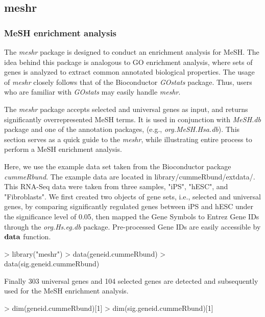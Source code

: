 \documentclass[11pt]{article}
\newcommand{\Rpackage}[1]{{\textit{#1}}}
\begin{document}
\clearpage
\subsection{meshr}
\subsubsection{MeSH enrichment analysis}
The \Rpackage{meshr} package is designed to conduct an enrichment analysis for MeSH.  The idea behind this package is analogous to GO enrichment analysis, where sets of genes is analyzed to extract common annotated biological properties. The usage of \Rpackage{meshr} closely follows that of the Bioconductor \Rpackage{GOstats} package. Thus, users who are familiar with \Rpackage{GOstats} may easily handle \Rpackage{meshr}.

The \Rpackage{meshr} package accepts selected and universal genes as input, and returns significantly overrepresented MeSH terms. It is used in conjunction with \Rpackage{MeSH.db} package and one of the annotation packages, (e.g., \Rpackage{org.MeSH.Hsa.db}). This section serves as a quick guide to the \Rpackage{meshr}, while illustrating entire process to perform a MeSH enrichment analysis.

Here, we use the example data set taken from the Bioconductor package \Rpackage{cummeRbund}. The example data are located in library/cummeRbund/extdata/. This RNA-Seq data were taken from three samples, "iPS", "hESC", and  "Fibroblasts".
We first created two objects of gene sets, i.e., selected and universal genes,
by comparing significantly regulated genes between iPS and hESC under the significance level of 0.05, then mapped the Gene Symbols to Entrez Gene IDs through the \Rpackage{org.Hs.eg.db} package. Pre-processed Gene IDs are easily accessible by $\bf{data}$ function.

\begin{center}
\begin{Schunk}
\begin{Sinput}
> library("meshr")
> data(geneid.cummeRbund)
> data(sig.geneid.cummeRbund)
\end{Sinput}
\end{Schunk}
\end{center}

Finally 303 universal genes and 104 selected genes are detected and subsequently
used for the MeSH enrichment analysis.

\begin{center}
\begin{Schunk}
\begin{Sinput}
> dim(geneid.cummeRbund)[1]
> dim(sig.geneid.cummeRbund)[1]
\end{Sinput}
\end{Schunk}
\end{center}
\end{document}
